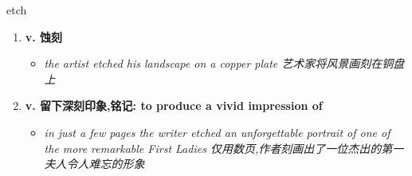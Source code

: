 
\begin{frame}
{\huge etch}
\begin{center}
\begin{enumerate}\Large
  \item \textbf{v. 蚀刻}
  \begin{itemize}
    \item \em{\Large{the artist etched his landscape on a copper plate 艺术家将风景画刻在铜盘上}}
  \end{itemize}
  \item \textbf{v. 留下深刻印象,铭记: to produce a vivid impression of}
  \begin{itemize}
    \item \em{\Large{in just a few pages the writer etched an unforgettable portrait of one of the more remarkable First Ladies 仅用数页,作者刻画出了一位杰出的第一夫人令人难忘的形象}}
  \end{itemize}
\end{enumerate}
\end{center}
\end{frame}

